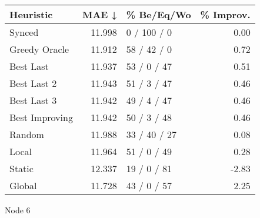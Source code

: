 \begin{tabular}{lrlr}
\toprule
\textbf{Heuristic} & \textbf{MAE ↓} & \textbf{\% Be/Eq/Wo} & \textbf{\% Improv.} \\
\midrule
            Synced &         11.998 &          0 / 100 / 0 &                0.00 \\
     Greedy Oracle &         11.912 &          58 / 42 / 0 &                0.72 \\
         Best Last &         11.937 &          53 / 0 / 47 &                0.51 \\
       Best Last 2 &         11.943 &          51 / 3 / 47 &                0.46 \\
       Best Last 3 &         11.942 &          49 / 4 / 47 &                0.46 \\
    Best Improving &         11.942 &          50 / 3 / 48 &                0.46 \\
            Random &         11.988 &         33 / 40 / 27 &                0.08 \\
             Local &         11.964 &          51 / 0 / 49 &                0.28 \\
            Static &         12.337 &          19 / 0 / 81 &               -2.83 \\
            Global &         11.728 &          43 / 0 / 57 &                2.25 \\
\bottomrule
\end{tabular}
\caption{Node 6}
\label{tab:ds_iid_lr01_le2_bs2_6}
